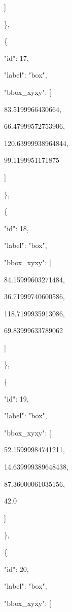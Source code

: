 \documentclass[10pt,a4paper]{article}
\begin{document}
      ]\par
    \},\allowbreak{}\par
    \{\par
      "id":\allowbreak{} 17,\allowbreak{}\par
      "label":\allowbreak{} "box",\allowbreak{}\par
      "bbox\_xyxy":\allowbreak{} [\par
        83.5199966430664,\allowbreak{}\par
        66.47999572753906,\allowbreak{}\par
        120.63999938964844,\allowbreak{}\par
        99.1199951171875\par
      ]\par
    \},\allowbreak{}\par
    \{\par
      "id":\allowbreak{} 18,\allowbreak{}\par
      "label":\allowbreak{} "box",\allowbreak{}\par
      "bbox\_xyxy":\allowbreak{} [\par
        84.15999603271484,\allowbreak{}\par
        36.71999740600586,\allowbreak{}\par
        118.7199935913086,\allowbreak{}\par
        69.83999633789062\par
      ]\par
    \},\allowbreak{}\par
    \{\par
      "id":\allowbreak{} 19,\allowbreak{}\par
      "label":\allowbreak{} "box",\allowbreak{}\par
      "bbox\_xyxy":\allowbreak{} [\par
        52.15999984741211,\allowbreak{}\par
        14.639999389648438,\allowbreak{}\par
        87.36000061035156,\allowbreak{}\par
        42.0\par
      ]\par
    \},\allowbreak{}\par
    \{\par
      "id":\allowbreak{} 20,\allowbreak{}\par
      "label":\allowbreak{} "box",\allowbreak{}\par
      "bbox\_xyxy":\allowbreak{} [\par
\end{document}
